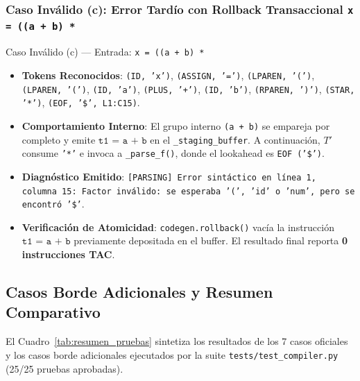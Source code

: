\documentclass[11pt, letterpaper]{article}
\begin{document}
\subsubsection{Caso Inválido (c): Error Tardío con Rollback Transaccional \texttt{x = ((a + b) *}}
\begin{errbox}{Caso Inválido (c) --- Entrada: \texttt{x = ((a + b) *}}
\begin{itemize}[leftmargin=1.5em, itemsep=2pt]
    \item \textbf{Tokens Reconocidos}: \texttt{(ID, 'x')}, \texttt{(ASSIGN, '=')}, \texttt{(LPAREN, '(')}, \texttt{(LPAREN, '(')}, \texttt{(ID, 'a')}, \texttt{(PLUS, '+')}, \texttt{(ID, 'b')}, \texttt{(RPAREN, ')')}, \texttt{(STAR, '*')}, \texttt{(EOF, '\$', L1:C15)}.
    \item \textbf{Comportamiento Interno}: El grupo interno \texttt{(a + b)} se empareja por completo y emite $\texttt{t1 = a + b}$ en el \texttt{\_staging\_buffer}. A continuación, $T'$ consume \texttt{'*'} e invoca a \texttt{\_parse\_f()}, donde el lookahead es \texttt{EOF ('\$')}.
    \item \textbf{Diagnóstico Emitido}: \texttt{[PARSING] Error sintáctico en línea 1, columna 15: Factor inválido: se esperaba '(', 'id' o 'num', pero se encontró '\$'}.
    \item \textbf{Verificación de Atomicidad}: \texttt{codegen.rollback()} vacía la instrucción $\texttt{t1 = a + b}$ previamente depositada en el buffer. El resultado final reporta \textbf{0 instrucciones TAC}.
\end{itemize}
\end{errbox}

\subsection{Casos Borde Adicionales y Resumen Comparativo}
El Cuadro~\ref{tab:resumen_pruebas} sintetiza los resultados de los 7 casos oficiales y los casos borde adicionales ejecutados por la suite \texttt{tests/test\_compiler.py} (25/25 pruebas aprobadas).
\end{document}
